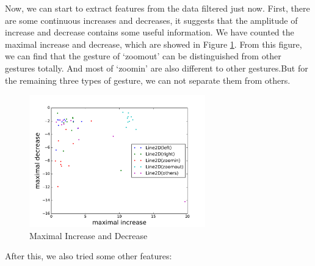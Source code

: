 \documentclass[conference]{IEEEtran}
\begin{document}
Now, we can start to extract features from the data filtered just now. First, there are some continuous increases and decreases, it suggests that the amplitude of increase and decrease contains some useful information. We have counted the maximal increase and decrease, which are showed in Figure \ref{max-inc-dec}. From this figure, we can find that the gesture of `zoomout' can be distinguished from other gestures totally. And most of `zoomin' are also different to other gestures.But for the remaining three types of gesture, we can not separate them from others. 

\begin{figure}[H]
\label{max-inc-dec}
\centering
\includegraphics[width=3in]{fs4.pdf}
\caption{Maximal Increase and Decrease}
\end{figure}

After this, we also tried some other features:
\end{document}
